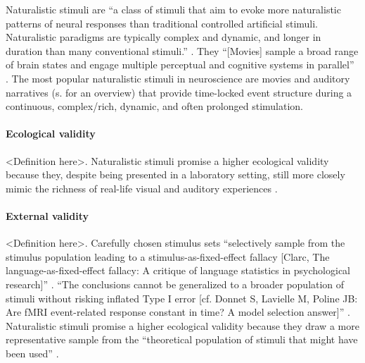 Naturalistic stimuli are ``a class of stimuli that aim to evoke more
naturalistic patterns of neural responses than traditional controlled artificial
stimuli. Naturalistic paradigms are typically complex and dynamic, and longer in
duration than many conventional stimuli.'' \citep{vanderwal2019movies}.
%
They ``[Movies] sample a broad range of brain states and engage multiple
perceptual and cognitive systems in parallel'' \citep{haxby2020naturalistic}.
The most popular naturalistic stimuli in neuroscience are movies and auditory
narratives (s. \citep{jaaskelainen2021movies, jaaskelainen2020neural} for an
overview) that provide time-locked event structure during a continuous,
complex/rich, dynamic, and often prolonged stimulation.


\paragraph{Ecological validity}
<Definition here>.
Naturalistic stimuli promise a higher ecological validity \citep{zaki2009need,
hasson2012future, hamilton2018revolution} because they, despite being presented
in a laboratory setting, still more closely mimic the richness of real-life
visual and auditory experiences \citep{hasson2008neurocinematics,
haxby2020naturalistic}.

\paragraph{External validity}
<Definition here>.
Carefully chosen stimulus sets ``selectively sample from the stimulus population
leading to a stimulus-as-fixed-effect fallacy [Clarc, The
language-as-fixed-effect fallacy: A critique of language statistics in
psychological research]'' \citep{westfall2016fixing}.
%
``The conclusions cannot be generalized to a broader population of stimuli
without risking inflated Type I error  [cf. Donnet S, Lavielle M, Poline JB: Are
fMRI event-related response constant in time? A model selection
answer]'' \citep{westfall2016fixing}.
%
Naturalistic stimuli promise a higher ecological validity because they draw a
more representative sample from the ``theoretical population of stimuli that
might have been used'' \citep{westfall2016fixing}.



